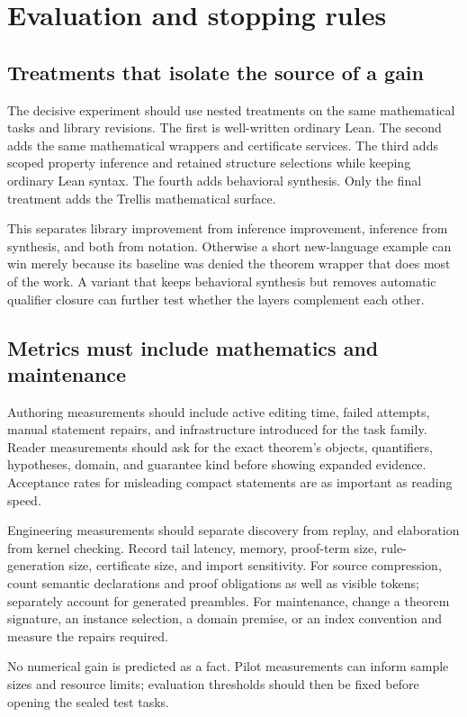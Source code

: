 \documentclass[11pt,a4paper]{article}
\theoremstyle{definition}
\theoremstyle{remark}
\begin{document}
\section{Evaluation and stopping rules}
\label{sec:evaluation}

\subsection{Treatments that isolate the source of a gain}
The decisive experiment should use nested treatments on the same mathematical tasks and library revisions. The first is well-written ordinary Lean. The second adds the same mathematical wrappers and certificate services. The third adds scoped property inference and retained structure selections while keeping ordinary Lean syntax. The fourth adds behavioral synthesis. Only the final treatment adds the Trellis mathematical surface.

This separates library improvement from inference improvement, inference from synthesis, and both from notation. Otherwise a short new-language example can win merely because its baseline was denied the theorem wrapper that does most of the work. A variant that keeps behavioral synthesis but removes automatic qualifier closure can further test whether the layers complement each other.

\subsection{Metrics must include mathematics and maintenance}
Authoring measurements should include active editing time, failed attempts, manual statement repairs, and infrastructure introduced for the task family. Reader measurements should ask for the exact theorem's objects, quantifiers, hypotheses, domain, and guarantee kind before showing expanded evidence. Acceptance rates for misleading compact statements are as important as reading speed.

Engineering measurements should separate discovery from replay, and elaboration from kernel checking. Record tail latency, memory, proof-term size, rule-generation size, certificate size, and import sensitivity. For source compression, count semantic declarations and proof obligations as well as visible tokens; separately account for generated preambles. For maintenance, change a theorem signature, an instance selection, a domain premise, or an index convention and measure the repairs required.

No numerical gain is predicted as a fact. Pilot measurements can inform sample sizes and resource limits; evaluation thresholds should then be fixed before opening the sealed test tasks.
\end{document}
